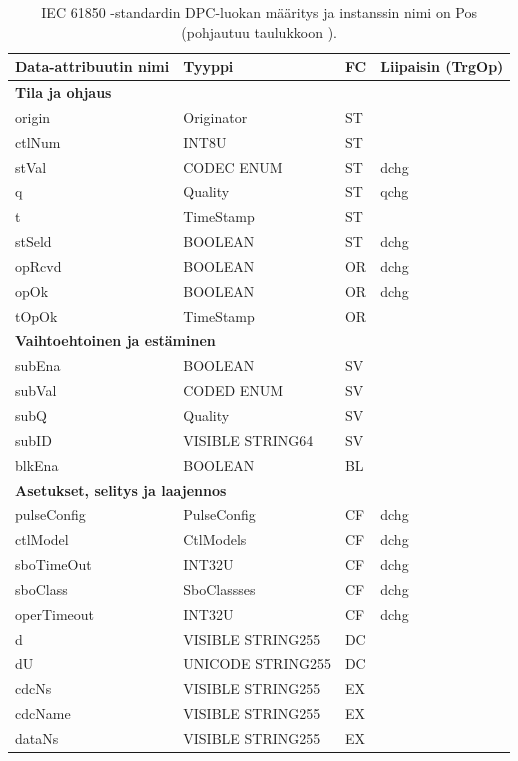 \begin{table}[ht!]
	\caption{IEC 61850 -standardin DPC-luokan määritys ja instanssin nimi on Pos (pohjautuu taulukkoon \mbox{\cite[s.~44]{IEC61850-7-3}}).}
	\label{tab:iec61850-DPC-class-definition}
	\begin{tabular}{l | l | l | l}
		\hline
		\textbf{Data-attribuutin nimi} & \textbf{Tyyppi} & \textbf{FC} & \textbf{Liipaisin (TrgOp)} \\
		\hline
		\multicolumn{4}{l}{\textbf{Tila ja ohjaus}} \\
		\hline
		origin & Originator & ST &  \\
		ctlNum & INT8U & ST &  \\
		stVal & CODEC ENUM & ST & dchg \\
		q & Quality & ST & qchg \\
		t & TimeStamp & ST &  \\
		stSeld & BOOLEAN & ST & dchg \\
		opRcvd & BOOLEAN & OR & dchg \\
		opOk & BOOLEAN & OR & dchg \\
		tOpOk & TimeStamp & OR &  \\
		\hline
		\multicolumn{4}{l}{\textbf{Vaihtoehtoinen ja estäminen}} \\
		\hline
		subEna & BOOLEAN & SV &  \\
		subVal & CODED ENUM & SV &  \\
		subQ & Quality & SV &  \\
		subID & VISIBLE STRING64 & SV &  \\
		blkEna & BOOLEAN & BL &  \\
		\hline
		\multicolumn{4}{l}{\textbf{Asetukset, selitys ja laajennos}} \\
		\hline
		pulseConfig & PulseConfig & CF & dchg \\
		ctlModel & CtlModels & CF & dchg \\
		sboTimeOut & INT32U & CF & dchg \\
		sboClass & SboClassses & CF & dchg \\
		operTimeout & INT32U & CF & dchg \\
		d & VISIBLE STRING255 & DC &  \\
		dU & UNICODE STRING255 & DC &  \\
		cdcNs & VISIBLE STRING255 & EX &  \\
		cdcName & VISIBLE STRING255 & EX &  \\
		dataNs & VISIBLE STRING255 & EX &  \\
		\hline
	\end{tabular}
\end{table}

